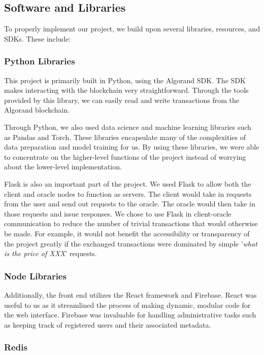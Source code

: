\documentclass{ledger}
\begin{document}
\subsection{Software and Libraries}

To properly implement our project, we build upon several libraries, resources, and SDKs.  These include:

\subsubsection{Python Libraries}

This project is primarily built in Python, using the Algorand SDK.  The SDK makes interacting with the blockchain very straightforward.  Through the tools provided by this library, we can easily read and write transactions from the Algorand blockchain.

Through Python, we also used data science and machine learning libraries such as Pandas and Torch.  These libraries encapsulate many of the complexities of data preparation and model training for us. By using these libraries, we were able to concentrate on the higher-level functions of the project instead of worrying about the lower-level implementation.

Flask is also an important part of the project.  We used Flask to allow both the client and oracle nodes to function as servers.  The client would take in requests from the user and send out requests to the oracle.  The oracle would then take in those requests and issue responses.  We chose to use Flask in client-oracle communication to reduce the number of trivial transactions that would otherwise be made.  For example, it would not benefit the accessibility or transparency of the project greatly if the exchanged transactions were dominated by simple '\textit{what is the price of XXX}' requests.

\subsubsection{Node Libraries}

Additionally, the front end utilizes the React framework and Firebase.  React was useful to us as it streamlined the process of making dynamic, modular code for the web interface.  Firebase was invaluable for handling administrative tasks such as keeping track of registered users and their associated metadata.

\subsubsection{Redis}
\end{document}
